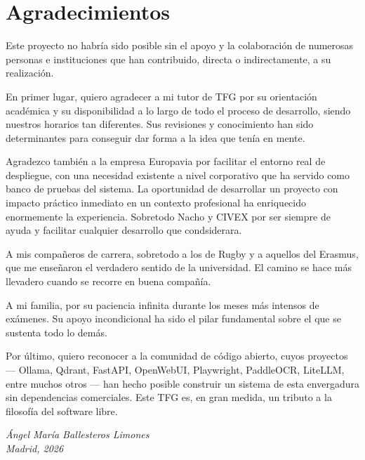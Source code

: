\chapter*{Agradecimientos}

Este proyecto no habría sido posible sin el apoyo y la colaboración de numerosas personas e instituciones que han contribuido, directa o indirectamente, a su realización.

En primer lugar, quiero agradecer a mi tutor de TFG por su orientación académica y su disponibilidad a lo largo de todo el proceso de desarrollo, siendo nuestros horarios tan diferentes. Sus revisiones y conocimiento han sido determinantes para conseguir dar forma a la idea que tenía en mente.

Agradezco también a la empresa Europavia por facilitar el entorno real de despliegue, con una necesidad existente a nivel corporativo que ha servido como banco de pruebas del sistema. La oportunidad de desarrollar un proyecto con impacto práctico inmediato en un contexto profesional ha enriquecido enormemente la experiencia. Sobretodo Nacho y CIVEX por ser siempre de ayuda y facilitar cualquier desarrollo que condsiderara.

A mis compañeros de carrera, sobretodo a los de Rugby y a aquellos del Erasmus, que me enseñaron el verdadero sentido de la universidad. El camino se hace más llevadero cuando se recorre en buena compañía.

A mi familia, por su paciencia infinita durante los meses más intensos de exámenes. Su apoyo incondicional ha sido el pilar fundamental sobre el que se sustenta todo lo demás.

Por último, quiero reconocer a la comunidad de código abierto, cuyos proyectos --- Ollama, Qdrant, FastAPI, OpenWebUI, Playwright, PaddleOCR, LiteLLM, entre muchos otros --- han hecho posible construir un sistema de esta envergadura sin dependencias comerciales. Este TFG es, en gran medida, un tributo a la filosofía del software libre.

\vspace{1cm}
\begin{flushright}
\textit{Ángel María Ballesteros Limones}\\
\textit{Madrid, 2026}
\end{flushright}
\newpage
